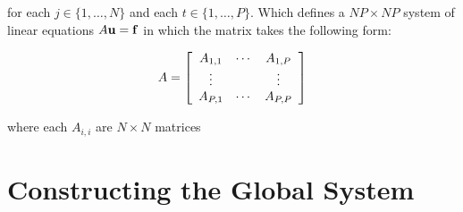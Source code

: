 for each $j \in \{1,\ldots,N\}$ and each $t \in \{1,\ldots,P\}$. Which defines
a $NP \times NP$ system of linear equations $A\mathbf{u} = \mathbf{f}$ in which the
matrix takes the following form:

\begin{equation}
    A = \left[\begin{array}{c c c}
            A_{1,1} & \cdots & A_{1,P} \\
            \vdots & & \vdots \\
            A_{P,1} & \cdots & A_{P,P}
        \end{array}\right]
\end{equation}

where each $A_{i,i}$ are $N \times N$ matrices

\section{Constructing the Global System}
